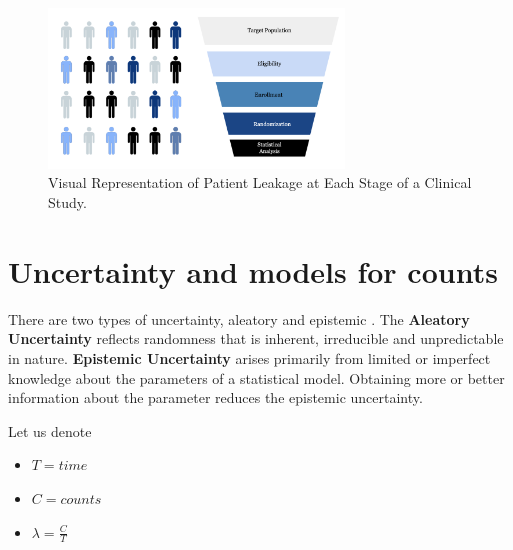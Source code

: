 \begin{figure}[h]
  \centering
  \includegraphics[width=0.7\textwidth]{fig_2_1_b.png}
  \caption{Visual Representation of Patient Leakage at Each Stage of a Clinical Study.  \citep{piantadosi2022principles, whelan2018high, bogin2022lasagna}}
  \label{fig:2_1_b}
\end{figure}

\section{Uncertainty and models for counts}

There are two types of uncertainty, aleatory and epistemic \citep{ohagan2006}. The \textbf{Aleatory Uncertainty} reflects randomness that is inherent, irreducible and unpredictable in nature. \textbf{Epistemic Uncertainty} arises primarily from limited or imperfect knowledge about the parameters of a statistical model. Obtaining more or better information about the parameter reduces the epistemic uncertainty. 

Let us denote

\begin{itemize}
\item $T=time$
\item $C=counts$
\item $\lambda=\frac{C}{T}$
\end{itemize}

\begin{table}[h!]
\centering
{}
\caption{Aleatory and epistemic uncertainty in accrual shown by different models for counts.}
\label{tab:count_modeling}
\end{table}

